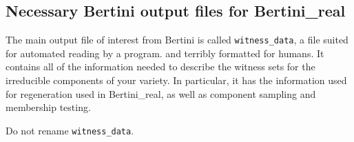 \subsection{Necessary Bertini output files for Bertini\_real}

The main output file of interest from Bertini is called \texttt{witness\_data}, a file suited for automated reading by a program. and terribly formatted for humans. It contains all of the information needed to describe the witness sets for the irreducible components of your variety. In particular, it has the information used for regeneration used in Bertini\_real, as well as component sampling and membership testing.

Do not rename {\tt witness\_data}.
